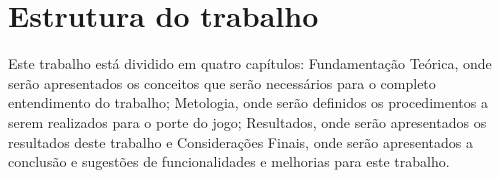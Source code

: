 \section*{Estrutura do trabalho}

Este trabalho está dividido em quatro capítulos: Fundamentação Teórica, onde serão apresentados os conceitos que serão necessários para o completo entendimento do trabalho; Metologia, onde serão definidos os procedimentos a serem realizados para o porte do jogo; Resultados, onde serão apresentados os resultados deste trabalho e Considerações Finais, onde serão apresentados a conclusão e sugestões de funcionalidades e melhorias para este trabalho.